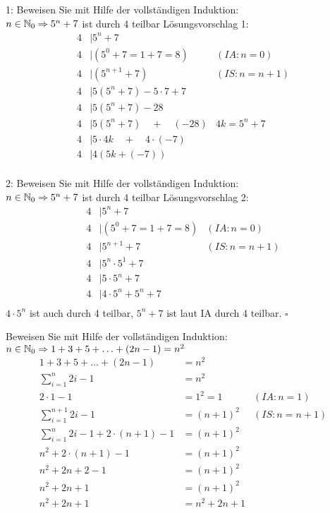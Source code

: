 \begin{card}
  1: Beweisen Sie mit Hilfe der vollständigen Induktion:\\
  $n \in \mathbb{N}_0 \Rightarrow 5^n + 7$ ist durch 4 teilbar
  \hr
  Lösungsvorschlag 1:
  \begin{align*}
    4 &\mid 5^n + 7 \\
    4 &\mid (5^0 + 7 = 1+7 = 8) & (IA: n=0) \\
    4 &\mid (5^{n+1} + 7) & (IS: n=n+1) \\
    4 &\mid 5 (5^n + 7) - 5 \cdot 7 + 7 & \\
    4 &\mid 5 (5^n + 7) - 28 & \\
    4 &\mid 5 (5^n + 7) \quad + \quad (-28) & 4k = 5^n + 7 \\
    4 &\mid 5 \cdot 4k \quad + \quad 4 \cdot (-7) & \\
    4 &\mid 4(5k + (-7)) & \\
  \end{align*}
\end{card}

\begin{card}
  2: Beweisen Sie mit Hilfe der vollständigen Induktion:\\
  $n \in \mathbb{N}_0 \Rightarrow 5^n + 7$ ist durch 4 teilbar
  \hr
  Lösungsvorschlag 2:
  \begin{align*}
    4 &\mid 5^n + 7 \\
    4 &\mid (5^0 + 7 = 1+7 = 8) & (IA: n=0) \\
    4 &\mid 5^{n+1} + 7 & (IS: n=n+1) \\
    4 &\mid 5^n \cdot 5^1 + 7 & \\
    4 &\mid 5 \cdot 5^n + 7 & \\
    4 &\mid 4 \cdot 5^n + 5^n + 7 & \\
  \end{align*}
  $4 \cdot 5^n$ ist auch durch 4 teilbar, $5^n + 7$ ist laut IA durch 4 teilbar. $\square$
\end{card}

\begin{card}
  Beweisen Sie mit Hilfe der vollständigen Induktion:\\
  $n \in \mathbb{N}_0 \Rightarrow 1 + 3 + 5 + \ldots + (2n - 1) = n^2$
  \hr
  \begin{align*}
    1 + 3 + 5 + \ldots + (2n - 1) &= n^2 \\
    \sum\limits_{i=1}^n 2i - 1 &= n^2 \\
    2 \cdot 1 - 1 &= 1^2 = 1 & (IA: n=1) \\
    \sum\limits_{i=1}^{n+1} 2i - 1 &= (n+1)^2 & (IS: n=n+1) \\
    \sum\limits_{i=1}^{n} 2i - 1 + 2 \cdot (n+1) - 1 &= (n+1)^2 & \\
    n^2 + 2 \cdot (n+1) - 1 &= (n+1)^2 & \\
    n^2 + 2n + 2 - 1 &= (n+1)^2 & \\
    n^2 + 2n + 1 &= (n+1)^2 & \\
    n^2 + 2n + 1 &= n^2 + 2n + 1
  \end{align*}
\end{card}

